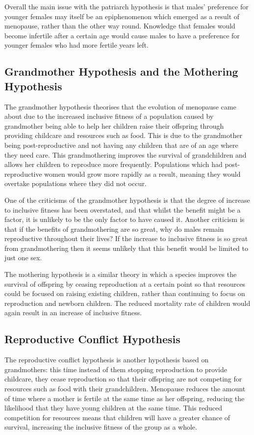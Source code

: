 \documentclass[authoryearcitations]{UoYCSproject}
\begin{document}
Overall the main issue with the patriarch hypothesis is that males' preference for younger females may itself be an epiphenomenon which emerged as a result of menopause, rather than the other way round. Knowledge that females would become infertile after a certain age would cause males to have a preference for younger females who had more fertile years left.

\subsection{Grandmother Hypothesis and the Mothering Hypothesis}
The grandmother hypothesis \cite{grandmother2000, grandmotheringProbabilistic2014, longevityGrandmother2012} theorises that the evolution of menopause came about due to the increased inclusive fitness of a population caused by grandmother being able to help her children raise their offspring through providing childcare and resources such as food. This is due to the grandmother being post-reproductive and not having any children that are of an age where they need care. This grandmothering improves the survival of grandchildren and allows her children to reproduce more frequently. Populations which had post-reproductive women would grow more rapidly as a result, meaning they would overtake populations where they did not occur. 

One of the criticisms of the grandmother hypothesis is that the degree of increase to inclusive fitness has been overstated, and that whilst the benefit might be a factor, it is unlikely to be the only factor to have caused it. Another criticism is that if the benefits of grandmothering are so great, why do males remain reproductive throughout their lives? If the increase to inclusive fitness is so great from grandmothering then it seems unlikely that this benefit would be limited to just one sex.

The mothering hypothesis is a similar theory in which a species improves the survival of offspring by ceasing reproduction at a certain point so that resources could be focused on raising existing children, rather than continuing to focus on reproduction and newborn children. The reduced mortality rate of children would again result in an increase of inclusive fitness.

\subsection{Reproductive Conflict Hypothesis}
The reproductive conflict hypothesis \cite{cant2008reproductive, repConflictOrca2017} is another hypothesis based on grandmothers: this time instead of them stopping reproduction to provide childcare, they cease reproduction so that their offspring are not competing for resources such as food with their grandchildren. Menopause reduces the amount of time where a mother is fertile at the same time as her offspring, reducing the likelihood that they have young children at the same time. This reduced competition for resources means that children will have a greater chance of survival, increasing the inclusive fitness of the group as a whole.
\end{document}
